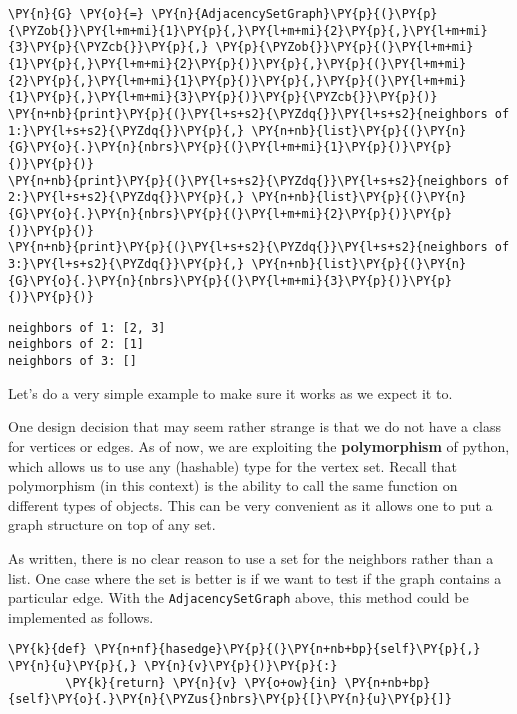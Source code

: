 \begin{Verbatim}[commandchars=\\\{\}]
\PY{n}{G} \PY{o}{=} \PY{n}{AdjacencySetGraph}\PY{p}{(}\PY{p}{\PYZob{}}\PY{l+m+mi}{1}\PY{p}{,}\PY{l+m+mi}{2}\PY{p}{,}\PY{l+m+mi}{3}\PY{p}{\PYZcb{}}\PY{p}{,} \PY{p}{\PYZob{}}\PY{p}{(}\PY{l+m+mi}{1}\PY{p}{,}\PY{l+m+mi}{2}\PY{p}{)}\PY{p}{,}\PY{p}{(}\PY{l+m+mi}{2}\PY{p}{,}\PY{l+m+mi}{1}\PY{p}{)}\PY{p}{,}\PY{p}{(}\PY{l+m+mi}{1}\PY{p}{,}\PY{l+m+mi}{3}\PY{p}{)}\PY{p}{\PYZcb{}}\PY{p}{)}
\PY{n+nb}{print}\PY{p}{(}\PY{l+s+s2}{\PYZdq{}}\PY{l+s+s2}{neighbors of 1:}\PY{l+s+s2}{\PYZdq{}}\PY{p}{,} \PY{n+nb}{list}\PY{p}{(}\PY{n}{G}\PY{o}{.}\PY{n}{nbrs}\PY{p}{(}\PY{l+m+mi}{1}\PY{p}{)}\PY{p}{)}\PY{p}{)}
\PY{n+nb}{print}\PY{p}{(}\PY{l+s+s2}{\PYZdq{}}\PY{l+s+s2}{neighbors of 2:}\PY{l+s+s2}{\PYZdq{}}\PY{p}{,} \PY{n+nb}{list}\PY{p}{(}\PY{n}{G}\PY{o}{.}\PY{n}{nbrs}\PY{p}{(}\PY{l+m+mi}{2}\PY{p}{)}\PY{p}{)}\PY{p}{)}
\PY{n+nb}{print}\PY{p}{(}\PY{l+s+s2}{\PYZdq{}}\PY{l+s+s2}{neighbors of 3:}\PY{l+s+s2}{\PYZdq{}}\PY{p}{,} \PY{n+nb}{list}\PY{p}{(}\PY{n}{G}\PY{o}{.}\PY{n}{nbrs}\PY{p}{(}\PY{l+m+mi}{3}\PY{p}{)}\PY{p}{)}\PY{p}{)}
\end{Verbatim}

\begin{Verbatim}
neighbors of 1: [2, 3]
neighbors of 2: [1]
neighbors of 3: []
\end{Verbatim}


Let's do a very simple example to make sure it works as we expect it to.


One design decision that may seem rather strange is that we do not have a class for vertices or edges.
As of now, we are exploiting the \textbf{polymorphism} of python, which allows us to use any (hashable) type for the vertex set.
Recall that polymorphism (in this context) is the ability to call the same function on different types of objects.
This can be very convenient as it allows one to put a graph structure on top of any set.


As written, there is no clear reason to use a set for the neighbors rather than a list.
One case where the set is better is if we want to test if the graph contains a particular edge.  With the \texttt{AdjacencySetGraph} above, this method could be implemented as follows.

\begin{Verbatim}[commandchars=\\\{\}]
    \PY{k}{def} \PY{n+nf}{hasedge}\PY{p}{(}\PY{n+nb+bp}{self}\PY{p}{,} \PY{n}{u}\PY{p}{,} \PY{n}{v}\PY{p}{)}\PY{p}{:}
        \PY{k}{return} \PY{n}{v} \PY{o+ow}{in} \PY{n+nb+bp}{self}\PY{o}{.}\PY{n}{\PYZus{}nbrs}\PY{p}{[}\PY{n}{u}\PY{p}{]}
\end{Verbatim}



